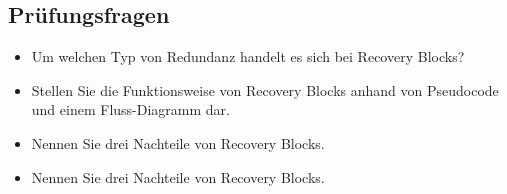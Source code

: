 \subsection{Prüfungsfragen}

\begin{itemize}
	\item Um welchen Typ von Redundanz handelt es sich bei Recovery Blocks?
	\item Stellen Sie die Funktionsweise von Recovery Blocks anhand von Pseudocode und einem Fluss-Diagramm dar.
	\item Nennen Sie drei Nachteile von Recovery Blocks.
\end{itemize}

\begin{itemize}
	\item Nennen Sie drei Nachteile von Recovery Blocks.
\end{itemize}


